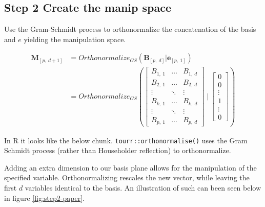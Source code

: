 \documentclass{monashthesis}
\begin{document}
\subsection{Step 2 Create the manip
space}\label{step-2-create-the-manip-space-1}

Use the Gram-Schmidt process to orthonormalize the concatenation of the
basis and \(e\) yielding the manipulation space.

\begin{align*}
  \textbf{M}_{[p,~d+1]}
  &= Orthonormalize_{GS}( \textbf{B}_{[p,~d]}|\textbf{e}_{[p,~1]} ) \\
  &= Orthonormalize_{GS}
  \left(
    \begin{bmatrix}
      B_{1,~1} & \dots  & B_{1,~d} \\
      B_{2,~1} & \dots  & B_{2,~d} \\
      \vdots   & \ddots & \vdots   \\
      B_{k,~1} & \dots  & B_{k,~d} \\
      \vdots   & \ddots & \vdots   \\
      B_{p,~1} & \dots  & B_{p,~d}
    \end{bmatrix}
  ~|~
    \begin{bmatrix}
      0 \\
      0 \\
      \vdots \\
      1 \\
      \vdots \\
      0
    \end{bmatrix}
  \right)
\end{align*}

In R it looks like the below chunk. \texttt{tourr::orthonormalise()}
uses the Gram Schmidt process (rather than Householder reflection) to
orthonormalize.

\begin{Shaded}
\begin{Highlighting}[]
\StringTok{ }\NormalTok{(}\NormalTok{, } 
\StringTok{ }
\StringTok{ }\OperatorTok{::}\NormalTok{(}
\end{Highlighting}
\end{Shaded}

Adding an extra dimension to our basis plane allows for the manipulation
of the specified variable. Orthonormalizing rescales the new vector,
while leaving the first \(d\) variables identical to the basis. An
illustration of such can been seen below in figure
\ref{fig:step2-paper}.
\end{document}
